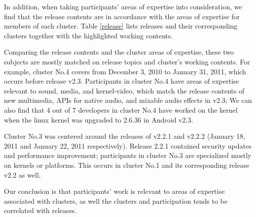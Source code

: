 \documentclass[10pt, conference, compsocconf]{IEEEtran}
\begin{document}
In addition, when taking participants' areas of expertise into consideration,
we find that the release contents are in accordance with the
areas of expertise for members of each cluster. Table \ref{release} lists
releases and their corresponding clusters together with the
highlighted working contents.


Comparing the release contents and the cluster areas of expertise, these two
subjects are mostly matched on release topics and cluster's working
contents. For example, cluster No.4 covers from December 3, 2010 to
January 31, 2011, which occurs before release v2.3. Participants in
cluster No.4 have areas of expertise relevant to sound, media, and kernel-video, which
match the release contents of new multimedia, APIs for native audio,
and mixable audio effects in v2.3; 
We can also find that 4 out of 7
developers in cluster No.4 have worked on the kernel when 
the linux kernel was upgraded to 2.6.36 in Android v2.3.

Cluster No.3 was centered around the releases of v2.2.1 and v2.2.2
(January 18, 2011 and January 22, 2011 respectively). Release 2.2.1
contained security updates and performance improvement; participants
in cluster No.3 are specialized mostly on kernels or platforms.  
This occurs in cluster
No.1 and its corresponding release v2.2 as well.


Our conclusion is that participants' work is relevant to areas of expertise
associated with clusters, as well the clusters and participation tends
to be correlated with releases.

%
%
\end{document}
